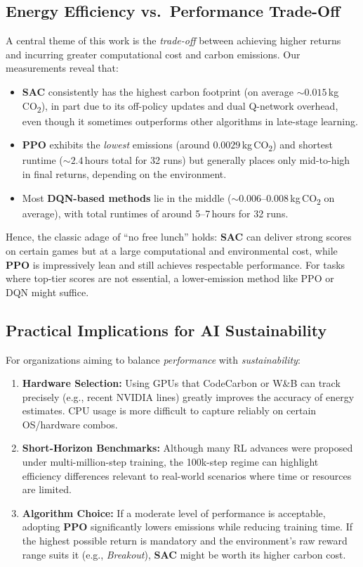 \subsection{Energy Efficiency vs.\ Performance Trade-Off}
\label{subsec:energy_vs_perf}
A central theme of this work is the \emph{trade-off} between achieving higher returns 
and incurring greater computational cost and carbon emissions. Our measurements reveal that:
\begin{itemize}
	\item \textbf{SAC} consistently has the highest carbon footprint (on average $\sim 0.015$\,kg\,CO\textsubscript{2}), 
	in part due to its off-policy updates and dual Q-network overhead, 
	even though it sometimes outperforms other algorithms in late-stage learning.
	\item \textbf{PPO} exhibits the \emph{lowest} emissions (around $0.0029$\,kg\,CO\textsubscript{2}) 
	and shortest runtime ($\sim2.4$\,hours total for 32 runs) but generally places 
	only mid-to-high in final returns, depending on the environment.
	\item Most \textbf{DQN-based methods} lie in the middle 
	($\sim0.006$--$0.008$\,kg\,CO\textsubscript{2} on average), 
	with total runtimes of around 5--7\,hours for 32 runs.
\end{itemize}

Hence, the classic adage of “no free lunch” holds: \textbf{SAC} can deliver strong scores 
on certain games but at a large computational and environmental cost, 
while \textbf{PPO} is impressively lean and still achieves respectable performance. 
For tasks where top-tier scores are not essential, 
a lower-emission method like PPO or DQN might suffice.

\subsection{Practical Implications for AI Sustainability}
\label{subsec:practical_sustainability}
For organizations aiming to balance \emph{performance} with \emph{sustainability}:
\begin{enumerate}
	\item \textbf{Hardware Selection:} 
	Using GPUs that CodeCarbon or W\&B can track precisely (e.g., recent NVIDIA lines) 
	greatly improves the accuracy of energy estimates. CPU usage is more difficult 
	to capture reliably on certain OS/hardware combos.
	\item \textbf{Short-Horizon Benchmarks:} 
	Although many RL advances were proposed under multi-million-step training, 
	the 100k-step regime can highlight efficiency differences relevant to 
	real-world scenarios where time or resources are limited.
	\item \textbf{Algorithm Choice:} 
	If a moderate level of performance is acceptable, adopting \textbf{PPO} 
	significantly lowers emissions while reducing training time. 
	If the highest possible return is mandatory and the environment's raw reward range 
	suits it (e.g., \emph{Breakout}), \textbf{SAC} might be worth its higher carbon cost.
\end{enumerate}

